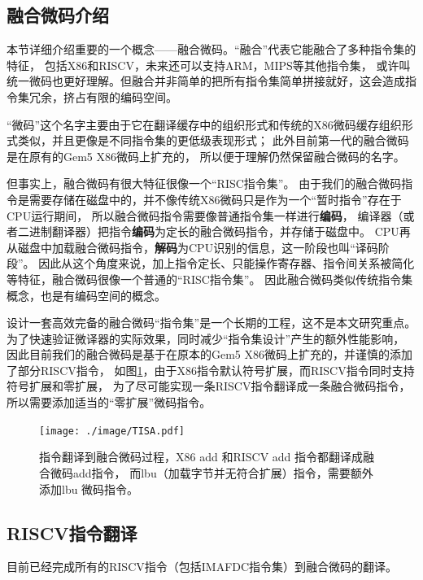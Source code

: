 \documentclass{Style/ucasproposal}%
\begin{document}
\subsection{融合微码介绍}
本节详细介绍重要的一个概念——融合微码。“融合”代表它能融合了多种指令集的特征，
包括X86和RISCV，未来还可以支持ARM，MIPS等其他指令集，
或许叫统一微码也更好理解。但融合并非简单的把所有指令集简单拼接就好，这会造成指令集冗余，挤占有限的编码空间。

“微码”这个名字主要由于它在翻译缓存中的组织形式和传统的X86微码缓存组织形式类似，并且更像是不同指令集的更低级表现形式；
此外目前第一代的融合微码是在原有的Gem5 X86微码上扩充的，
所以便于理解仍然保留融合微码的名字。

但事实上，融合微码有很大特征很像一个“RISC指令集”。
由于我们的融合微码指令是需要存储在磁盘中的，并不像传统X86微码只是作为一个“暂时指令”存在于CPU运行期间，
所以融合微码指令需要像普通指令集一样进行\textbf{编码}，
编译器（或者二进制翻译器）把指令\textbf{编码}为定长的融合微码指令，并存储于磁盘中。
CPU再从磁盘中加载融合微码指令，\textbf{解码}为CPU识别的信息，这一阶段也叫“译码阶段”。
因此从这个角度来说，加上指令定长、只能操作寄存器、指令间关系被简化等特征，融合微码很像一个普通的“RISC指令集”。
因此融合微码类似传统指令集概念，也是有编码空间的概念。

设计一套高效完备的融合微码“指令集”是一个长期的工程，这不是本文研究重点。
为了快速验证微译器的实际效果，同时减少“指令集设计”产生的额外性能影响，
因此目前我们的融合微码是基于在原本的Gem5 X86微码上扩充的，并谨慎的添加了部分RISCV指令，
如图\ref{img:TISA}，由于X86指令默认符号扩展，而RISCV指令同时支持符号扩展和零扩展，
为了尽可能实现一条RISCV指令翻译成一条融合微码指令，所以需要添加适当的“零扩展”微码指令。

\begin{figure}[h]
  \centering
  \texttt{[image: ./image/TISA.pdf]}
  \caption{指令翻译到融合微码过程，X86 add 和RISCV add 指令都翻译成融合微码add指令，
  而lbu（加载字节并无符合扩展）指令，需要额外添加lbu 微码指令。}
  \label{img:TISA}
\end{figure}

\subsection{RISCV指令翻译}

目前已经完成所有的RISCV指令（包括IMAFDC指令集）到融合微码的翻译。
\end{document}
